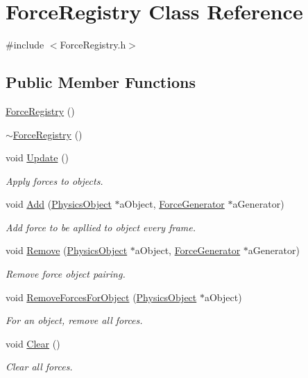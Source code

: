 \hypertarget{classForceRegistry}{}\section{Force\+Registry Class Reference}
\label{classForceRegistry}


{\ttfamily \#include $<$Force\+Registry.\+h$>$}

\subsection*{Public Member Functions}
\begin{DoxyCompactItemize}
\item 
\hyperlink{classForceRegistry_ab69e6e3b787675dc1ce0d58ba49701af}{Force\+Registry} ()
\item 
\hyperlink{classForceRegistry_a88048f34e9ce4968967de7418681181b}{$\sim$\+Force\+Registry} ()
\item 
void \hyperlink{classForceRegistry_a8febcd744c3790be29fbb2311486ae9e}{Update} ()
\begin{DoxyCompactList}\small\item\em Apply forces to objects. \end{DoxyCompactList}\item 
void \hyperlink{classForceRegistry_a75593d52a622aeb567ee0acf6c7f3950}{Add} (\hyperlink{classPhysicsObject}{Physics\+Object} $\ast$a\+Object, \hyperlink{classForceGenerator}{Force\+Generator} $\ast$a\+Generator)
\begin{DoxyCompactList}\small\item\em Add force to be apllied to object every frame. \end{DoxyCompactList}\item 
void \hyperlink{classForceRegistry_a0db4ce225bb277d455c539a75400b699}{Remove} (\hyperlink{classPhysicsObject}{Physics\+Object} $\ast$a\+Object, \hyperlink{classForceGenerator}{Force\+Generator} $\ast$a\+Generator)
\begin{DoxyCompactList}\small\item\em Remove force object pairing. \end{DoxyCompactList}\item 
void \hyperlink{classForceRegistry_a8c0eab836bdf28dc589f8fe20425a42c}{Remove\+Forces\+For\+Object} (\hyperlink{classPhysicsObject}{Physics\+Object} $\ast$a\+Object)
\begin{DoxyCompactList}\small\item\em For an object, remove all forces. \end{DoxyCompactList}\item 
void \hyperlink{classForceRegistry_a5cd064be5bf7edb0ac72d6b05a536ee8}{Clear} ()
\begin{DoxyCompactList}\small\item\em Clear all forces. \end{DoxyCompactList}\end{DoxyCompactItemize}
